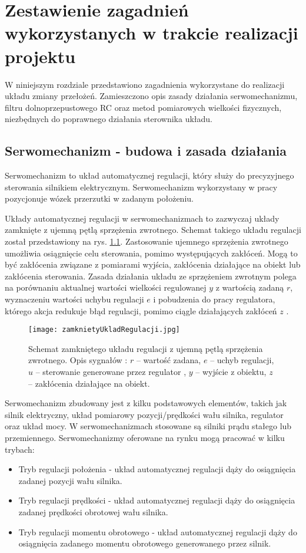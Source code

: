 \chapter{Zestawienie zagadnień wykorzystanych w trakcie realizacji projektu}
\label{cha:Zestawienie zagadnien wykorzystanych w pracy}

W niniejszym rozdziale przedstawiono zagadnienia wykorzystane do realizacji układu zmiany przełożeń. Zamieszczono opis zasady działania serwomechanizmu, filtru dolnoprzepustowego RC oraz metod pomiarowych wielkości fizycznych, niezbędnych do poprawnego działania sterownika układu.
 
\section{Serwomechanizm - budowa i zasada działania}
Serwomechanizm to układ automatycznej regulacji, który służy do precyzyjnego sterowania silnikiem elektrycznym. Serwomechanizm wykorzystany w pracy pozycjonuje wózek przerzutki w zadanym położeniu.

Układy automatycznej regulacji w serwomechanizmach to zazwyczaj układy zamknięte z ujemną pętlą sprzężenia zwrotnego. Schemat takiego układu regulacji został przedstawiony na rys. \ref{fig:zamknietyUklad}. Zastosowanie ujemnego sprzężenia zwrotnego umożliwia osiągnięcie celu sterowania, pomimo występujących zakłóceń. Mogą to być zakłócenia związane z pomiarami wyjścia, zakłócenia działające na obiekt lub zakłócenia sterowania. Zasada działania układu ze sprzężeniem zwrotnym polega na porównaniu aktualnej wartości wielkości regulowanej $y$ z wartością zadaną $r$, wyznaczeniu wartości uchybu regulacji $e$ i pobudzenia do pracy regulatora, którego akcja redukuje błąd regulacji, pomimo ciągle działających zakłóceń $z$ \cite{zamknietyB}.
\begin{figure}[h]
    \centering
    \texttt{[image: zamknietyUkladRegulacji.jpg]}
    \caption{Schemat zamkniętego układu regulacji z ujemną pętlą sprzężenia zwrotnego. Opis sygnałów : $r$ – wartość zadana,  $e$ – uchyb regulacji, $u$ – sterowanie generowane przez regulator , $y$ – wyjście z obiektu, $z$ – zakłócenia działające na obiekt.}
    \label{fig:zamknietyUklad}
\end{figure}

Serwomechanizm zbudowany jest z kilku podstawowych elementów, takich jak silnik elektryczny, układ pomiarowy pozycji/prędkości wału silnika, regulator oraz układ mocy. W serwomechanizmach stosowane są silniki prądu stałego lub przemiennego. Serwomechanizmy oferowane na rynku mogą pracować w kilku trybach:
\begin{itemize}
\item
     Tryb regulacji położenia - układ automatycznej regulacji dąży do osiągnięcia zadanej pozycji wału silnika.
\item
    Tryb regulacji prędkości - układ automatycznej regulacji dąży do osiągnięcia zadanej prędkości obrotowej wału silnika.
\item
    Tryb regulacji momentu obrotowego - układ automatycznej regulacji dąży do osiągnięcia zadanego momentu obrotowego generowanego przez silnik.
\end{itemize}

